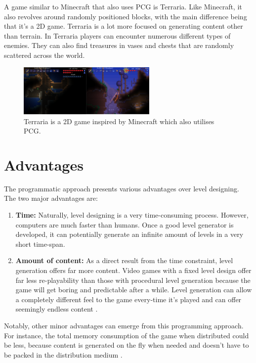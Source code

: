 A game similar to Minecraft that also uses PCG is Terraria. Like Minecraft, it also revolves around randomly positioned blocks, with the main difference being that it's a 2D game. Terraria is a lot more focused on generating content other than terrain. In Terraria players can encounter numerous different types of enemies. They can also find treasures in vases and chests that are randomly scattered across the world.
\begin{figure}[h!]
\centering
\includegraphics[width=0.6\textwidth]{images/terraria.png}
\caption{Terraria is a 2D game inspired by Minecraft which also utilises PCG.}
\end{figure}

	\section{Advantages}
The programmatic approach presents various advantages over level designing. The two major advantages are:
\begin{enumerate}
\item {\bf Time:} Naturally, level designing is a very time-consuming process. However, computers are much faster than humans. Once a good level generator is developed, it can potentially generate an infinite amount of levels in a very short time-span. 

\item {\bf Amount of content:} As a direct result from the time constraint, level generation offers far more content. Video games with a fixed level design offer far less re-playability than those with procedural level generation because the game will get boring and predictable after a while. Level generation can allow a completely different feel to the game every-time it's played and can offer seemingly endless content \citep{DBLP:conf/aiide/ComptonM06}.
\end{enumerate}

Notably, other minor advantages can emerge from this programming approach. For instance, the total memory consumption of the game when distributed could be less, because content is generated on the fly when needed and doesn't have to be packed in the distribution medium \citep{DBLP:journals/tciaig/TogeliusYSB11}.


